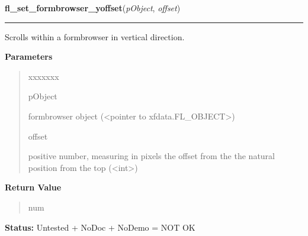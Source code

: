 \hspace{.8\funcindent}\begin{boxedminipage}{\funcwidth}

    \raggedright \textbf{fl\_set\_formbrowser\_yoffset}(\textit{pObject}, \textit{offset})

    \vspace{-1.5ex}

    \rule{\textwidth}{0.5\fboxrule}
\setlength{\parskip}{2ex}
    Scrolls within a formbrowser in vertical direction.

\setlength{\parskip}{1ex}
      \textbf{Parameters}
      \vspace{-1ex}

      \begin{quote}
        \begin{Ventry}{xxxxxxx}

          \item[pObject]

          formbrowser object ({\textless}pointer to 
          xfdata.FL\_OBJECT{\textgreater})

          \item[offset]

          positive number, measuring in pixels the offset from the the 
          natural position from the top ({\textless}int{\textgreater})

        \end{Ventry}

      \end{quote}

      \textbf{Return Value}
    \vspace{-1ex}

      \begin{quote}
      num

      \end{quote}

\textbf{Status:} Untested + NoDoc + NoDemo = NOT OK



    \end{boxedminipage}

    \label{xformslib:library:fl_get_formbrowser_xoffset}

    \vspace{0.5ex}

